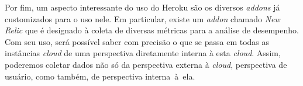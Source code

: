 Por fim, um aspecto interessante do uso do Heroku são os diversos \emph{addons} já customizados para o uso nele. Em particular, existe um \emph{addon} chamado \emph{New Relic} que é designado à coleta de diversas métricas para a análise de desempenho. Com seu uso, será possível saber com precisão o que se passa em todas as instâncias \emph{cloud} de uma perspectiva diretamente interna à esta \emph{cloud}. Assim, poderemos coletar dados não só da perspectiva externa à \emph{cloud}, perspectiva de usuário, como também, de perspectiva interna~à~ela.